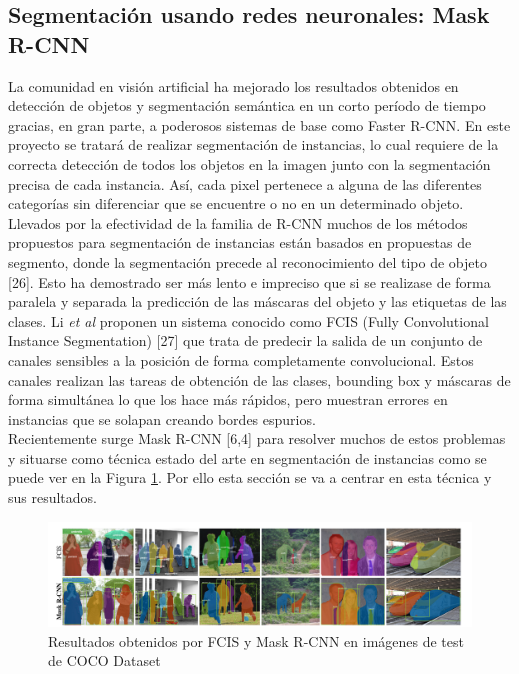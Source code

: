\documentclass{bmvc2k}
\def\etal{\emph{et al}\bmvaOneDot}
\begin{document}
\subsection{Segmentación usando redes neuronales: Mask R-CNN}
La comunidad en visión artificial ha mejorado los resultados obtenidos en detección de objetos y segmentación semántica en un corto período de tiempo gracias, en gran parte, a poderosos sistemas de base como Faster R-CNN. En este proyecto se tratará de realizar segmentación de instancias, lo cual requiere de la correcta detección de todos los objetos en la imagen junto con la segmentación precisa de cada instancia. Así, cada pixel pertenece a alguna de las diferentes categorías sin diferenciar que se encuentre o no en un determinado objeto.\\
Llevados por la efectividad de la familia de R-CNN muchos de los métodos propuestos para segmentación de instancias están basados en propuestas de segmento, donde la segmentación precede al reconocimiento del tipo de objeto [26]. Esto ha demostrado ser más lento e impreciso que si se realizase de forma paralela y separada la predicción de las máscaras del objeto y las etiquetas de las clases. Li \etal{} proponen un sistema conocido como FCIS (Fully Convolutional Instance Segmentation) [27] que trata de predecir la salida de un conjunto de canales sensibles a la posición de forma completamente convolucional. Estos canales realizan las tareas de obtención de las clases, bounding box y máscaras de forma simultánea lo que los hace más rápidos, pero muestran errores en instancias que se solapan creando bordes espurios.\\
Recientemente surge Mask R-CNN [6,4] para resolver muchos de estos problemas y situarse como técnica estado del arte en segmentación de instancias como se puede ver en la Figura \ref{fig:fcis_mask}. Por ello esta sección se va a centrar en esta técnica y sus resultados.
\begin{figure}[h!]
\begin{center}
\includegraphics[scale=0.30]{fcis_vs_maskrcnn.png}
\caption{Resultados obtenidos por FCIS y Mask R-CNN en imágenes de test de COCO Dataset}
\label{fig:fcis_mask}
\end{center}
\end{figure}
\end{document}
